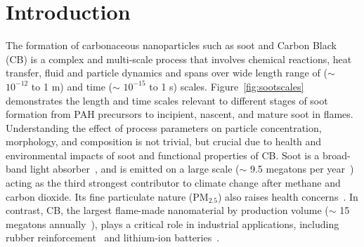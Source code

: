 \section{Introduction}
The formation of carbonaceous nanoparticles such as soot and Carbon Black (CB) is a complex and multi-scale process that involves chemical reactions, heat transfer, fluid and particle dynamics and spans over wide length range of ($\sim$ $10^{-12}$ to 1 m) and time ($\sim$ $10^{-15}$ to 1 s) scales. Figure~\ref{fig:sootscales} demonstrates the length and time scales relevant to different stages of soot formation from PAH precursors to incipient, nascent, and mature soot in flames. Understanding the effect of process parameters on particle concentration, morphology, and composition is not trivial, but crucial due to health and environmental impacts of soot and functional properties of CB.
Soot is a broad-band light absorber~\cite{d2009combustion}, and is emitted on a large scale ($\sim$ 9.5 megatons per year~\citep{myhre2014anthropogenic}) acting as the third strongest contributor to climate change after methane and carbon dioxide. Its fine particulate nature ($\mathrm{PM_{2.5}}$) also raises health concerns~\citep{borm2004inhaled}. In contrast, CB, the largest flame-made nanomaterial by production volume ($\sim$ 15 megatons annually~\citep{rosner2024techno}), plays a critical role in industrial applications, including rubber reinforcement~\citep{international2016carbon} and lithium-ion batteries~\citep{Palomares2010}.


